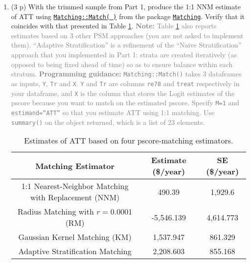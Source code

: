 \documentclass{article}
\begin{document}
\begin{enumerate}[label=\textbf{Q\arabic{enumi}}.,ref=Q\arabic{enumi}, wide=0pt, itemsep=0em, topsep=5pt, labelindent=0pt, resume]
\item (3 p) With the trimmed sample from Part 1, produce the 1:1 NNM estimate of ATT using \href{https://www.rdocumentation.org/packages/Matching/versions/4.9-6/topics/Match}{\texttt{Matching::Match( )}} from the package \href{https://cran.r-project.org/web/packages/Matching/Matching.pdf}{\texttt{Matching}}. Verify that it coincides with that presented in Table \ref{tab:Tab25-4_2}. \textcolor{gray}{\textbf{Note:} Table \ref{tab:Tab25-4_2} also reports estimates based on 3 other PSM approaches (you are not asked to implement them). ``Adaptive Stratification'' is a refinement of the ``Naive Stratification'' approach that you implemented in Part 1: strata are created iteratively (as opposed to being fixed ahead of time) so as to ensure balance within each stratum.}  \textcolor{gray}{\textbf{Programming guidance:} \texttt{Matching::Match()} takes 3 dataframes as inputs, \texttt{Y}, \texttt{Tr} and \texttt{X}. \texttt{Y} and \texttt{Tr} are columns \texttt{re78} and \texttt{treat} respectively in your dataframe, and \texttt{X} is the column that stores the Logit estimates of the pscore because you want to match on the estimated pscore. Specify \texttt{M=1} and \texttt{estimand=``ATT''} so that you estimate ATT using 1:1 matching. Use \texttt{summary()} on the object returned, which is a list of 23 elements.} \label{item:estimate-att-ncs}

\begin{table}[H]
\centering
\begin{tabular}{ccc}
\hline \hline
\textbf{Matching Estimator} & \textbf{Estimate (\$/year)} & \textbf{SE (\$/year)} \\ \hline
1:1 Nearest-Neighbor Matching with Replacement (NNM)       &  490.39 & 1,929.6  \\
Radius Matching with $r=0.0001$ (RM)  &  -5,546.139 &  4,614.773 \\
Gaussian Kernel Matching (KM)        &  1,537.947 & 861.329  \\ 
Adaptive Stratification Matching     &  2,208.603 &  855.168 \\ \hline
\end{tabular}
\caption{Estimates of ATT based on four pscore-matching estimators.}
\label{tab:Tab25-4_2}
\end{table}


\end{enumerate}
\end{document}
